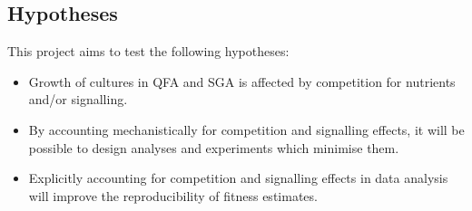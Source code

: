 \subsection{Hypotheses}
This project aims to test the following hypotheses:
\begin{itemize}
\item Growth of cultures in QFA and SGA is affected by competition for
  nutrients and/or signalling.
\item By accounting mechanistically for competition and signalling
  effects, it will be possible to design analyses and experiments
  which minimise them.
\item Explicitly accounting for competition and signalling effects in
  data analysis will improve the reproducibility of fitness estimates.
\end{itemize}

